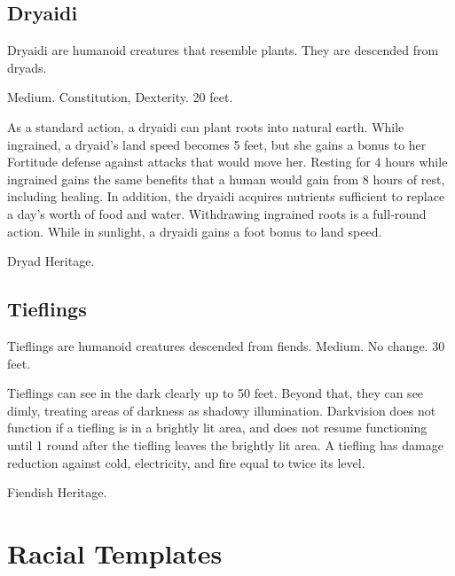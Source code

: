     \subsection{Dryaidi}

        Dryaidi are humanoid creatures that resemble plants. They are descended from dryads.

         Medium.
          Constitution,  Dexterity.
         20 feet.
        \begin{itemize}
             As a standard action, a dryaidi can plant roots into natural earth. While ingrained, a dryaid's land speed becomes 5 feet, but she gains a  bonus to her Fortitude defense against attacks that would move her. Resting for 4 hours while ingrained gains the same benefits that a human would gain from 8 hours of rest, including healing. In addition, the dryaidi acquires nutrients sufficient to replace a day's worth of food and water. Withdrawing ingrained roots is a full-round action.
             While in sunlight, a dryaidi gains a  foot bonus to land speed.
        \end{itemize}
         Dryad Heritage.

    \subsection{Tieflings}

        Tieflings are humanoid creatures descended from fiends.
         Medium.
         No change.
         30 feet.
        \begin{itemize}
             Tieflings can see in the dark clearly up to 50 feet. Beyond that, they can see dimly, treating areas of darkness as shadowy illumination. Darkvision does not function if a tiefling is in a brightly lit area, and does not resume functioning until 1 round after the tiefling leaves the brightly lit area.
             A tiefling has damage reduction against cold, electricity, and fire equal to twice its level.
        \end{itemize}
         Fiendish Heritage.

\section{Racial Templates}

